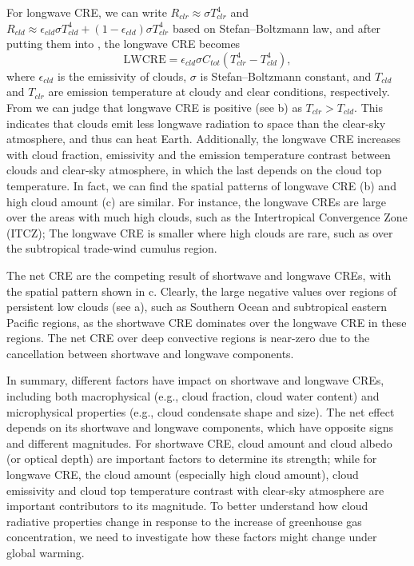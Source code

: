 For longwave CRE, we can write $R_{clr}\approx \sigma T_{clr}^4$ and $R_{cld}\approx \epsilon_{cld}\sigma T_{cld}^4 +  (1-\epsilon_{cld}) \sigma T_{clr}^4$ based on Stefan--Boltzmann law, and after putting them into , the longwave CRE becomes
\begin{equation}
    \mathrm{LWCRE}=\epsilon_{cld} \sigma C_{tot}\left(T_{clr}^4-T_{cld}^4\right),
    \label{eq:lwcre2}
\end{equation}
where $\epsilon_{cld}$ is the emissivity of clouds, $\sigma$ is Stefan--Boltzmann constant, and $T_{cld}$ and $T_{clr}$ are emission temperature at cloudy and clear conditions, respectively. From  we can judge that longwave CRE is positive  (see b) as $T_{clr}>T_{cld}$. This indicates that clouds emit less longwave radiation to space than the clear-sky atmosphere, and thus can heat Earth. Additionally, the longwave CRE increases with cloud fraction, emissivity and the emission temperature contrast between clouds and clear-sky atmosphere, in which the last depends on the cloud top temperature. In fact, we can find the spatial patterns of longwave CRE (b) and high cloud amount (c) are similar. For instance, the longwave CREs are large over the areas with much high clouds, such as the Intertropical Convergence Zone (ITCZ); The longwave CRE is smaller where high clouds are rare, such as over the subtropical trade-wind cumulus region.

The net CRE are the competing result of shortwave and longwave CREs, with the spatial pattern shown in c. Clearly, the large negative values over regions of persistent low clouds (see a), such as Southern Ocean and subtropical eastern Pacific regions, as the shortwave CRE dominates over the longwave CRE in these regions. The net CRE over deep convective regions is near-zero due to the cancellation between shortwave and longwave components.

In summary, different factors have impact on shortwave and longwave CREs, including both macrophysical (e.g., cloud fraction, cloud water content) and microphysical properties (e.g., cloud condensate shape and size). The net effect depends on its shortwave and longwave components, which have opposite signs and different magnitudes. For shortwave CRE, cloud amount and cloud albedo (or optical depth) are important factors to determine its strength; while for longwave CRE, the cloud amount (especially high cloud amount), cloud emissivity and cloud top temperature contrast with clear-sky atmosphere are important contributors to its magnitude. To better understand how cloud radiative properties change in response to the increase of greenhouse gas concentration, we need to investigate how these factors might change under global warming.

